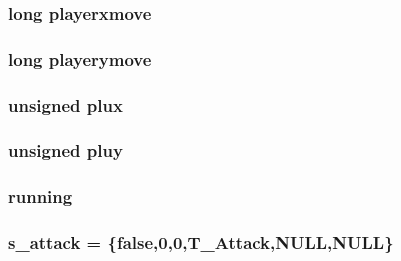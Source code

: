 \label{WL__AGENT_8C_aefadb4c91f358f1a8b80113dff2433f1}
\hypertarget{WL__AGENT_8C_a7f5cea5586913d773629c89545c77a07}{
\subsubsection[{playerxmove}]{\setlength{\rightskip}{0pt plus 5cm}long {\bf playerxmove}}}
\label{WL__AGENT_8C_a7f5cea5586913d773629c89545c77a07}
\hypertarget{WL__AGENT_8C_ab34d4aa1726c04e90dabd23eff2c324f}{
\subsubsection[{playerymove}]{\setlength{\rightskip}{0pt plus 5cm}long {\bf playerymove}}}
\label{WL__AGENT_8C_ab34d4aa1726c04e90dabd23eff2c324f}
\hypertarget{WL__AGENT_8C_a098f3c7a6e9b99f0d4d5fbb552b46754}{
\subsubsection[{plux}]{\setlength{\rightskip}{0pt plus 5cm}unsigned {\bf plux}}}
\label{WL__AGENT_8C_a098f3c7a6e9b99f0d4d5fbb552b46754}
\hypertarget{WL__AGENT_8C_a2b130e086f58d4d881053d67b98c8251}{
\subsubsection[{pluy}]{\setlength{\rightskip}{0pt plus 5cm}unsigned {\bf pluy}}}
\label{WL__AGENT_8C_a2b130e086f58d4d881053d67b98c8251}
\hypertarget{WL__AGENT_8C_a2bb58b88ac256b165a95a806ae3b41e5}{
\subsubsection[{running}]{ {\bf running}}}
\label{WL__AGENT_8C_a2bb58b88ac256b165a95a806ae3b41e5}
\hypertarget{WL__AGENT_8C_a8cf5fca2f0794aeeca4ba0504e1230ef}{
\subsubsection[{s\_\-attack}]{ {\bf s\_\-attack} = \{false,0,0,T\_\-Attack,NULL,NULL\}}}
